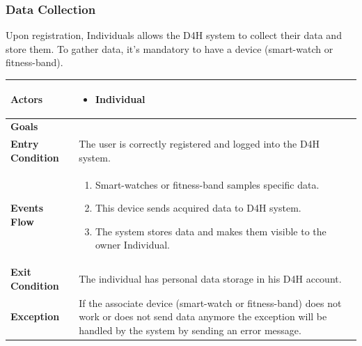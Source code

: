         \subsubsection{Data Collection}
            
            Upon registration, Individuals allows the D4H system to collect their data and store them. To gather data, it's mandatory to have a device (smart-watch or fitness-band). 
            
            \begin{table}[H]
            	\centering
                
                \begin{tabular}{|p{3cm}|p{8.2cm}|}
                    \hline
                    \textbf{Actors} & \begin{itemize}
                        \item Individual
                    \end{itemize} \\
                     \hline
                    \textbf{Goals} & \\ 
                     \hline
                    \textbf{Entry Condition} & The user is correctly registered and logged into the D4H system.\\
                     \hline
                    \textbf{Events Flow} & \begin{enumerate}
                                                \item Smart-watches or fitness-band samples specific data.
                                                \item This device sends acquired data to D4H system.
                                                \item The system stores data and makes them visible to the owner Individual.
                                            \end{enumerate}\\
                     \hline
                    \textbf{Exit Condition} & The individual has personal data storage in his D4H account.\\
                     \hline
                    \textbf{Exception} & If the associate device (smart-watch or fitness-band) does not work or does not send data anymore the exception will be handled by the system by sending an error message. \\
                     \hline
                \end{tabular}  
            \end{table} 
            
